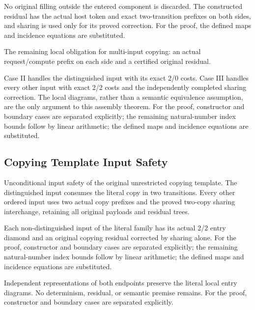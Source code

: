 No original filling outside the entered component is discarded. The constructed residual has the actual host token and exact two-transition prefixes on both sides, and sharing is used only for its proved correction.
For the proof, the defined maps and incidence equations are substituted.
\par{}

The remaining local obligation for multi-input copying: an actual request/compute prefix on each side and a certified original residual.
\par{}

Case II handles the distinguished input with its exact 2/0 costs. Case III handles every other input with exact 2/2 costs and the independently completed sharing correction. The local diagrams, rather than a semantic equivalence assumption, are the only argument to this assembly theorem.
For the proof, constructor and boundary cases are separated explicitly; the remaining natural-number index bounds follow by linear arithmetic; the defined maps and incidence equations are substituted.
\par{}

\subsection{Copying Template Input Safety}
Unconditional input safety of the original unrestricted copying template. The distinguished input consumes the literal copy in two transitions. Every other ordered input uses two actual copy prefixes and the proved two-copy sharing interchange, retaining all original payloads and residual trees.

Each non-distinguished input of the literal family has its actual 2/2 entry diamond and an original copying residual corrected by sharing alone.
For the proof, constructor and boundary cases are separated explicitly; the remaining natural-number index bounds follow by linear arithmetic; the defined maps and incidence equations are substituted.
\par{}

Independent representations of both endpoints preserve the literal local entry diagrams. No determinism, residual, or semantic premise remains.
For the proof, constructor and boundary cases are separated explicitly.
\par{}


